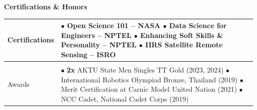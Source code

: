 \documentclass[9pt]{extarticle}
\newcommand{\sectionhead}[1]{%
  \par\vspace{7.5pt}%
  \noindent\begin{tcolorbox}\textbf{\fontsize{10}{10.5}\selectfont #1}\end{tcolorbox}%
}
\begin{document}
\sectionhead{Certifications \& Honors}%
\noindent\begin{tabular}{|m{2.6cm}|m{16.3cm}|}
\hline
\centering\textbf{Certifications} &
\(\bullet\) \textbf{Open Science 101} -- NASA \quad
\(\bullet\) \textbf{Data Science for Engineers} -- NPTEL\newline
\(\bullet\) \textbf{Enhancing Soft Skills \& Personality} -- NPTEL \quad
\(\bullet\) \textbf{IIRS Satellite Remote Sensing} -- ISRO\\
\hline
\centering\textbf{Honors \&\\[0pt]Awards} &
\(\bullet\) \textbf{2x} AKTU State Men Singles TT Gold (2023, 2024) \quad
\(\bullet\) International Robotics Olympiad Bronze, Thailand (2019) \quad
\(\bullet\) Merit Certification at Carnic Model United Nation (2021) \quad
\(\bullet\) NCC Cadet, National Cadet Corps (2019)\\
\hline
\end{tabular}%
\end{document}
